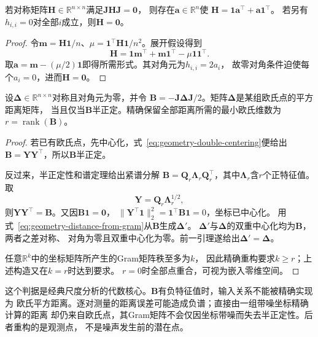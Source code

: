 \begin{lemma}[双重中心化核的形式]
\label{lem:geometry-double-centering-kernel}
若对称矩阵$\bm H\in\mathbb R^{n\times n}$满足$\bm J\bm H\bm J=\bm0$，
则存在$\bm a\in\mathbb R^n$使
$\bm H=\bm1\bm a^\top+\bm a\bm1^\top$。
若另有$h_{i,i}=0$对全部$i$成立，则$\bm H=\bm0$。
\end{lemma}
\begin{proof}
令$\bm m=\bm H\bm1/n$、$\mu=\bm1^\top\bm H\bm1/n^2$。展开假设得到
\[
  \bm H=\bm1\bm m^\top+\bm m\bm1^\top-\mu\bm1\bm1^\top.
\]
取$\bm a=\bm m-(\mu/2)\bm1$即得所需形式。其对角元为$h_{i,i}=2a_i$，
故零对角条件迫使每个$a_i=0$，进而$\bm H=\bm0$。
\end{proof}

\begin{theorem}[有限距离的欧氏坐标重构]
\label{thm:geometry-euclidean-distance-embedding}
设$\bm\Delta\in\mathbb R^{n\times n}$对称且对角元为零，并令
$\bm B=-\bm J\bm\Delta\bm J/2$。矩阵$\bm\Delta$是某组欧氏点的平方距离矩阵，
当且仅当$\bm B$半正定。精确保留全部距离所需的最小欧氏维数为
$r=\operatorname{rank}(\bm B)$。
\end{theorem}
\begin{proof}
若已有欧氏点，先中心化，式~\eqref{eq:geometry-double-centering}便给出
$\bm B=\bm Y\bm Y^\top$，所以$\bm B$半正定。

反过来，半正定性和谱定理给出紧谱分解
$\bm B=\bm Q_r\bm\Lambda_r\bm Q_r^\top$，其中$\bm\Lambda_r$含$r$个正特征值。
取
\begin{equation}
  \bm Y=\bm Q_r\bm\Lambda_r^{1/2},
  \label{eq:geometry-classical-scaling-coordinates}
\end{equation}
则$\bm Y\bm Y^\top=\bm B$。又因$\bm B\bm1=\bm0$，
$\lVert\bm Y^\top\bm1\rVert_2^2=\bm1^\top\bm B\bm1=0$，坐标已中心化。
用式~\eqref{eq:geometry-distance-from-gram}从$\bm B$生成$\bm\Delta'$。
$\bm\Delta'$与$\bm\Delta$的双重中心化均为$\bm B$，两者之差对称、
对角为零且双重中心化为零。前一引理遂给出$\bm\Delta'=\bm\Delta$。

任意$\mathbb R^k$中的坐标矩阵所产生的Gram矩阵秩至多为$k$，
因此精确重构要求$k\geq r$；上述构造又在$k=r$时达到要求。
$r=0$时全部点重合，可视为嵌入零维空间。
\end{proof}

这个判据是经典尺度分析的代数核心。$\bm B$有负特征值时，输入关系不能被精确实现为
欧氏平方距离。逐对测量的距离误差可能造成负谱；直接由一组带噪坐标精确计算的距离
却仍来自欧氏点，其Gram矩阵不会仅因坐标带噪而失去半正定性。后者重构的是观测点，
不是噪声发生前的潜在点。


